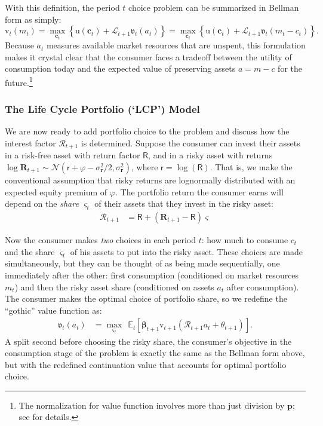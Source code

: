 \documentclass{article}
\newcommand{\uFunc}{\mathrm{u}}
\newcommand{\cLvl}{\mathbf{c}}
\newcommand{\Rport}{\mathcal{R}}
\newcommand{\pLvl}{\mathbf{p}}
\newcommand{\vFunc}{\mathrm{v}}
\newcommand{\Alive}{\mathcal{L}}
\newcommand{\Ex}{\mathbb{E}}
\newcommand{\cNrm}{c}
\newcommand{\aNrm}{a}
\newcommand{\mNrm}{m}
\newcommand{\Rfree}{\mathsf{R}}
\newcommand{\rfree}{\mathsf{r}}
\newcommand{\eprem}{\varphi}
\newcommand{\Risky}{\mathbf{R}}
\newcommand{\risky}{\mathbf{r}}
\begin{document}
With this definition, the period $t$ choice problem can be summarized in Bellman form as simply:
\begin{equation}
\vFunc_t(\mNrm_t) = \max_{\cLvl_t} \left\{ \uFunc(\cLvl_{t}) + \Alive_{t+1} \mathfrak{v}_{t}(\aNrm_{t}) \right\} = \max_{\cLvl_t} \left\{ \uFunc(\cLvl_{t}) + \Alive_{t+1} \mathfrak{v}_{t}(\mNrm_{t} - \cNrm_t) \right\}.
\end{equation}
Because $\aNrm_t$ measures available market resources that are unspent, this formulation makes it crystal clear that the consumer faces a tradeoff between the utility of consumption today and the expected value of preserving assets $\aNrm=\mNrm -\cNrm$ for the future.\footnote{The normalization for value function involves more than just division by $\pLvl$; see \cite{BufferStockTheory} for details.}

\subsubsection{The Life Cycle Portfolio (`LCP') Model}\label{lcp-model}

We are now ready to add portfolio choice to the problem and discuss how the interest factor $\Rport_{t+1}$ is determined.
Suppose the consumer can invest their assets in a risk-free asset with return factor $\Rfree$, and in a risky asset with returns $\log \Risky_{t+1} \sim \mathcal{N}(\rfree + \eprem - \sigma^{2}_{\risky}/2, \sigma_{\risky}^{2})$, where $\rfree = \log(\Rfree)$.
That is, we make the conventional assumption that risky returns are lognormally distributed with an expected equity premium of $\eprem$.
The portfolio return the consumer earns will depend on the \textit{share} $\varsigma_t$ of their assets that they invest in the risky asset:
\begin{align}
    \Rport_{t+1} & = \Rfree + (\Risky_{t+1}-\Rfree)\varsigma
\end{align}

Now the consumer makes \textit{two} choices in each period $t$: how much to consume $\cNrm_t$ and the share $\varsigma_t$ of his assets to put into the risky asset.
These choices are made simultaneously, but they can be thought of as being made sequentially, one immediately after the other: first consumption (conditioned on market resources $\mNrm_t$) and then the risky asset share (conditioned on assets $\aNrm_t$ after consumption).
The consumer makes the optimal choice of portfolio share, so we redefine the ``gothic'' value function as:
\begin{align}
\mathfrak{v}_{t}(\aNrm_t) & = \max_{\varsigma_t}~~ \Ex_{t}\left[ \pmb{\beta}_{t+1} \vFunc_{t+1}(\Rport_{t+1} \aNrm_t + \theta_{t+1}) \right].
\end{align}
A split second before choosing the risky share, the consumer's objective in the consumption stage of the problem is exactly the same as the Bellman form above, but with the redefined continuation value that accounts for optimal portfolio choice.
\end{document}
